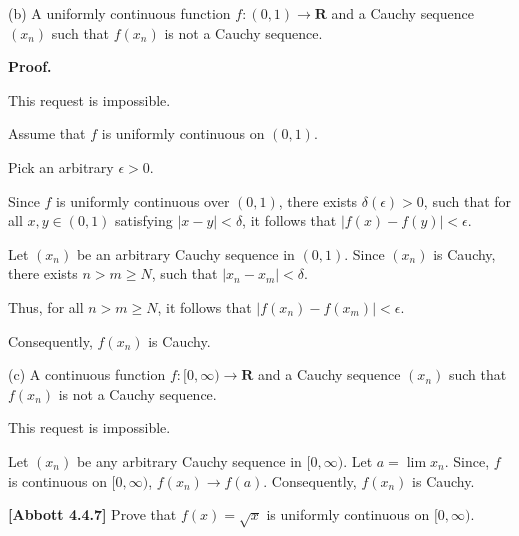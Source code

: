 \documentclass[10pt]{article}
\begin{document}
(b) A uniformly continuous function $\displaystyle f:( 0,1)\rightarrow \mathbf{R}$ and a Cauchy sequence $\displaystyle ( x_{n})$ such that $\displaystyle f( x_{n})$ is not a Cauchy sequence.



\textbf{Proof.} 



This request is impossible.



Assume that $\displaystyle f$ is uniformly continuous on $\displaystyle ( 0,1)$. 



Pick an arbitrary $\displaystyle \epsilon  >0$.



Since $\displaystyle f$ is uniformly continuous over $\displaystyle ( 0,1)$, there exists $\displaystyle \delta ( \epsilon )  >0$, such that for all $\displaystyle x,y\in ( 0,1)$ satisfying $\displaystyle |x-y|< \delta $, it follows that $\displaystyle |f( x) -f( y) |< \epsilon $.



Let $\displaystyle ( x_{n})$ be an arbitrary Cauchy sequence in $\displaystyle ( 0,1)$. Since $\displaystyle ( x_{n})$ is Cauchy, there exists $\displaystyle n >m\geq N$, such that $\displaystyle |x_{n} -x_{m} |< \delta $. 



Thus, for all $\displaystyle n >m\geq N$, it follows that $\displaystyle |f( x_{n}) -f( x_{m}) |< \epsilon $. 



Consequently, $\displaystyle f( x_{n})$ is Cauchy.



(c) A continuous function $\displaystyle f:[ 0,\infty )\rightarrow \mathbf{R}$ and a Cauchy sequence $\displaystyle ( x_{n})$ such that $\displaystyle f( x_{n})$ is not a Cauchy sequence.



This request is impossible.



Let $\displaystyle ( x_{n})$ be any arbitrary Cauchy sequence in $\displaystyle [ 0,\infty )$. Let $\displaystyle a=\lim x_{n}$. Since, $\displaystyle f$ is continuous on $\displaystyle [ 0,\infty )$, $\displaystyle f( x_{n})\rightarrow f( a)$. Consequently, $\displaystyle f( x_{n})$ is Cauchy.



\textbf{[Abbott 4.4.7]} Prove that $\displaystyle f( x) =\sqrt{x}$ is uniformly continuous on $\displaystyle [ 0,\infty )$. 
\end{document}
